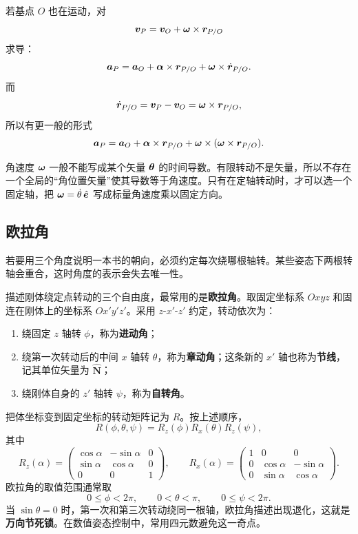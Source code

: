 若基点 \(O\) 也在运动，对
\[
\boldsymbol{v}_P=\boldsymbol{v}_O+\boldsymbol{\omega}\times\boldsymbol{r}_{P/O}
\]
求导：
\[
\boldsymbol{a}_P=\boldsymbol{a}_O+\boldsymbol\alpha\times\boldsymbol{r}_{P/O}
+\boldsymbol{\omega}\times\dot{\boldsymbol{r}}_{P/O}.
\]
而
\[
\dot{\boldsymbol{r}}_{P/O}=\boldsymbol{v}_P-\boldsymbol{v}_O=\boldsymbol{\omega}\times\boldsymbol{r}_{P/O},
\]
所以有更一般的形式
\begin{equation}
\boldsymbol{a}_P
=\boldsymbol{a}_O+\boldsymbol\alpha\times\boldsymbol{r}_{P/O}
+\boldsymbol{\omega}\times(\boldsymbol{\omega}\times\boldsymbol{r}_{P/O}).
\label{eq:rigid-acceleration-general}
\end{equation}

\begin{remark}
角速度 \(\boldsymbol{\omega}\) 一般不能写成某个矢量 \(\boldsymbol{\theta}\) 的时间导数。有限转动不是矢量，所以不存在一个全局的“角位置矢量”使其导数等于角速度。只有在定轴转动时，才可以选一个固定轴，把 \(\boldsymbol{\omega}=\dot\theta\,\hat{\boldsymbol{e}}\) 写成标量角速度乘以固定方向。
\end{remark}

\subsection{欧拉角}

若要用三个角度说明一本书的朝向，必须约定每次绕哪根轴转。某些姿态下两根转轴会重合，这时角度的表示会失去唯一性。

描述刚体绕定点转动的三个自由度，最常用的是\textbf{欧拉角}。取固定坐标系 \(Oxyz\) 和固连在刚体上的坐标系 \(O x'y'z'\)。采用 \(z\)-\(x'\)-\(z'\) 约定，转动依次为：

\begin{enumerate}[leftmargin=1.8em]
  \item 绕固定 \(z\) 轴转 \(\phi\)，称为\textbf{进动角}；
  \item 绕第一次转动后的中间 $x$ 轴转 \(\theta\)，称为\textbf{章动角}；这条新的 \(x'\) 轴也称为\textbf{节线}，记其单位矢量为 \(\hat{\boldsymbol N}\)；
  \item 绕刚体自身的 \(z'\) 轴转 \(\psi\)，称为\textbf{自转角}。
\end{enumerate}

把体坐标变到固定坐标的转动矩阵记为 \(R\)。按上述顺序，
\begin{equation}
R(\phi,\theta,\psi)
=R_z(\phi)R_x(\theta)R_z(\psi),
\label{eq:euler-matrix}
\end{equation}
其中
\[
R_z(\alpha)=
\begin{pmatrix}
\cos\alpha & -\sin\alpha & 0\\
\sin\alpha & \cos\alpha & 0\\
0&0&1
\end{pmatrix},
\qquad
R_x(\alpha)=
\begin{pmatrix}
1&0&0\\
0&\cos\alpha&-\sin\alpha\\
0&\sin\alpha&\cos\alpha
\end{pmatrix}.
\]
欧拉角的取值范围通常取
\[
0\le\phi<2\pi,\qquad 0<\theta<\pi,\qquad 0\le\psi<2\pi.
\]
当 \(\sin\theta=0\) 时，第一次和第三次转动绕同一根轴，欧拉角描述出现退化，这就是\textbf{万向节死锁}。在数值姿态控制中，常用四元数避免这一奇点。

